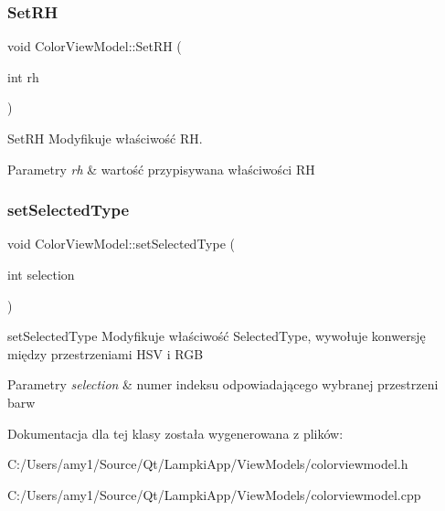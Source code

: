 \subsubsection{\texorpdfstring{Set\+RH}{SetRH}}
{\footnotesize\ttfamily void Color\+View\+Model\+::\+Set\+RH (\begin{DoxyParamCaption}\item[{int}]{rh }\end{DoxyParamCaption})\hspace{0.3cm}{\ttfamily [slot]}}



Set\+RH Modyfikuje właściwość RH. 


\begin{DoxyParams}{Parametry}
{\em rh} & wartość przypisywana właściwości RH \\
\hline
\end{DoxyParams}
\mbox{\label{class_color_view_model_a51b5ff8b09631334b01ad95e0559452f}} 
\subsubsection{\texorpdfstring{set\+Selected\+Type}{setSelectedType}}
{\footnotesize\ttfamily void Color\+View\+Model\+::set\+Selected\+Type (\begin{DoxyParamCaption}\item[{int}]{selection }\end{DoxyParamCaption})\hspace{0.3cm}{\ttfamily [slot]}}



set\+Selected\+Type Modyfikuje właściwość Selected\+Type, wywołuje konwersję między przestrzeniami H\+SV i R\+GB 


\begin{DoxyParams}{Parametry}
{\em selection} & numer indeksu odpowiadającego wybranej przestrzeni barw \\
\hline
\end{DoxyParams}


Dokumentacja dla tej klasy została wygenerowana z plików\+:\begin{DoxyCompactItemize}
\item 
C\+:/\+Users/amy1/\+Source/\+Qt/\+Lampki\+App/\+View\+Models/colorviewmodel.\+h\item 
C\+:/\+Users/amy1/\+Source/\+Qt/\+Lampki\+App/\+View\+Models/colorviewmodel.\+cpp\end{DoxyCompactItemize}
